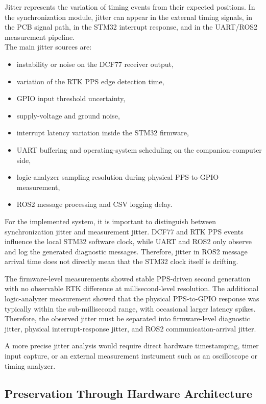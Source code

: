 Jitter represents the variation of timing events from their expected positions. In the synchronization module, jitter can appear in the external timing signals, in the PCB signal path, in the STM32 interrupt response, and in the UART/ROS2 measurement pipeline.
\\
The main jitter sources are:
\begin{itemize}
    \item instability or noise on the DCF77 receiver output,
    \item variation of the RTK PPS edge detection time,
    \item GPIO input threshold uncertainty,
    \item supply-voltage and ground noise,
    \item interrupt latency variation inside the STM32 firmware,
    \item UART buffering and operating-system scheduling on the companion-computer side,
    \item logic-analyzer sampling resolution during physical PPS-to-GPIO measurement,
    \item ROS2 message processing and CSV logging delay.
\end{itemize}

For the implemented system, it is important to distinguish between synchronization jitter and measurement jitter. DCF77 and RTK PPS events influence the local STM32 software clock, while UART and ROS2 only observe and log the generated diagnostic messages. Therefore, jitter in ROS2 message arrival time does not directly mean that the STM32 clock itself is drifting.

The firmware-level measurements showed stable PPS-driven second generation with no observable RTK difference at millisecond-level resolution. The additional logic-analyzer measurement showed that the physical PPS-to-GPIO response was typically within the sub-millisecond range, with occasional larger latency spikes. Therefore, the observed jitter must be separated into firmware-level diagnostic jitter, physical interrupt-response jitter, and ROS2 communication-arrival jitter.

A more precise jitter analysis would require direct hardware timestamping, timer input capture, or an external measurement instrument such as an oscilloscope or timing analyzer.

\subsection{Preservation Through Hardware Architecture}

